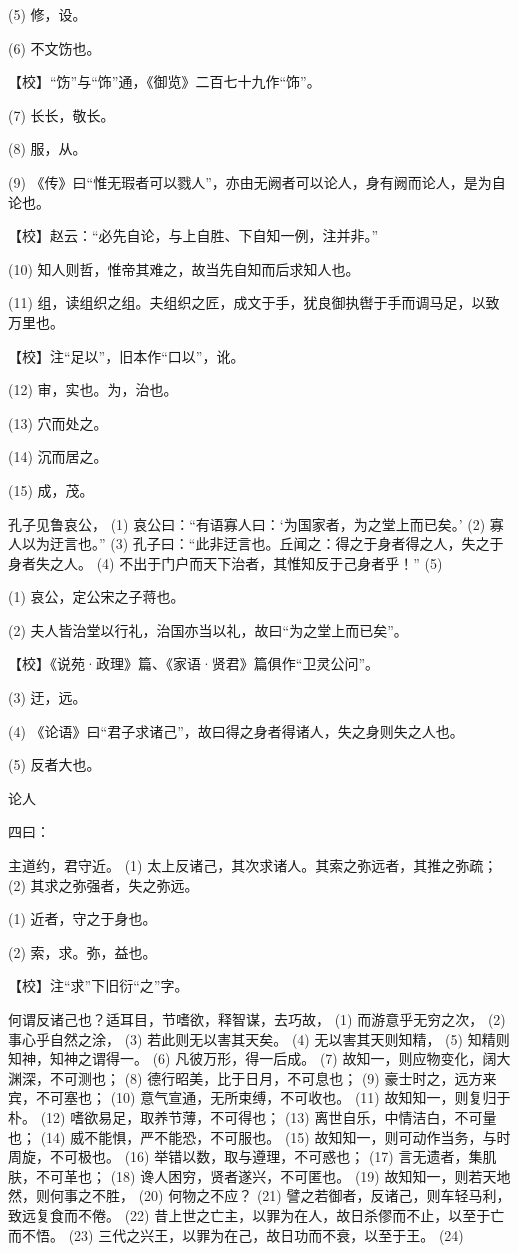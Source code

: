 \documentclass[12pt,UTF8]{ctexbook}
\begin{document}
(5) 修，设。

(6) 不文饬也。

【校】“饬”与“饰”通，《御览》二百七十九作“饰”。

(7) 长长，敬长。

(8) 服，从。

(9) 《传》曰“惟无瑕者可以戮人”，亦由无阙者可以论人，身有阙而论人，是为自论也。

【校】赵云：“必先自论，与上自胜、下自知一例，注并非。”

(10) 知人则哲，惟帝其难之，故当先自知而后求知人也。

(11) 组，读组织之组。夫组织之匠，成文于手，犹良御执辔于手而调马足，以致万里也。

【校】注“足以”，旧本作“口以”，讹。

(12) 审，实也。为，治也。

(13) 穴而处之。

(14) 沉而居之。

(15) 成，茂。

孔子见鲁哀公， (1) 哀公曰：“有语寡人曰：‘为国家者，为之堂上而已矣。’ (2) 寡人以为迂言也。” (3) 孔子曰：“此非迂言也。丘闻之：得之于身者得之人，失之于身者失之人。 (4) 不出于门户而天下治者，其惟知反于己身者乎！” (5)

(1) 哀公，定公宋之子蒋也。

(2) 夫人皆治堂以行礼，治国亦当以礼，故曰“为之堂上而已矣”。

【校】《说苑·政理》篇、《家语·贤君》篇俱作“卫灵公问”。

(3) 迂，远。

(4) 《论语》曰“君子求诸己”，故曰得之身者得诸人，失之身则失之人也。

(5) 反者大也。





论人


四曰：

主道约，君守近。 (1) 太上反诸己，其次求诸人。其索之弥远者，其推之弥疏； (2) 其求之弥强者，失之弥远。

(1) 近者，守之于身也。

(2) 索，求。弥，益也。

【校】注“求”下旧衍“之”字。

何谓反诸己也？适耳目，节嗜欲，释智谋，去巧故， (1) 而游意乎无穷之次， (2) 事心乎自然之涂， (3) 若此则无以害其天矣。 (4) 无以害其天则知精， (5) 知精则知神，知神之谓得一。 (6) 凡彼万形，得一后成。 (7) 故知一，则应物变化，阔大渊深，不可测也； (8) 德行昭美，比于日月，不可息也； (9) 豪士时之，远方来宾，不可塞也； (10) 意气宣通，无所束缚，不可收也。 (11) 故知知一，则复归于朴。 (12) 嗜欲易足，取养节薄，不可得也； (13) 离世自乐，中情洁白，不可量也； (14) 威不能惧，严不能恐，不可服也。 (15) 故知知一，则可动作当务，与时周旋，不可极也。 (16) 举错以数，取与遵理，不可惑也； (17) 言无遗者，集肌肤，不可革也； (18) 谗人困穷，贤者遂兴，不可匿也。 (19) 故知知一，则若天地然，则何事之不胜， (20) 何物之不应？ (21) 譬之若御者，反诸己，则车轻马利，致远复食而不倦。 (22) 昔上世之亡主，以罪为在人，故日杀僇而不止，以至于亡而不悟。 (23) 三代之兴王，以罪为在己，故日功而不衰，以至于王。 (24)
\end{document}
